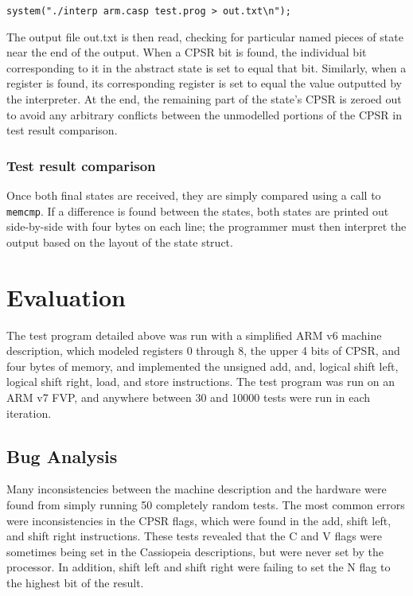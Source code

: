 \documentclass[letterpaper,12pt]{article}
\begin{document}
\texttt{system("./interp arm.casp test.prog > out.txt\textbackslash n");}

The output file out.txt is then read, checking for particular named pieces of state near the end of the output. When a CPSR bit is found, the individual bit corresponding to it in the abstract state is set to equal that bit. Similarly, when a register is found, its corresponding register is set to equal the value outputted by the interpreter. At the end, the remaining part of the state's CPSR is zeroed out to avoid any arbitrary conflicts between the unmodelled portions of the CPSR in test result comparison.

\subsubsection{Test result comparison}

Once both final states are received, they are simply compared using a call to \texttt{memcmp}. If a difference is found between the states, both states are printed out side-by-side with four bytes on each line; the programmer must then interpret the output based on the layout of the state struct.

\section{Evaluation}

The test program detailed above was run with a simplified ARM v6 machine description, which modeled registers 0 through 8, the upper 4 bits of CPSR, and four bytes of memory, and implemented the unsigned add, and, logical shift left, logical shift right, load, and store instructions. The test program was run on an ARM v7 FVP, and anywhere between 30 and 10000 tests were run in each iteration.

\subsection{Bug Analysis}

Many inconsistencies between the machine description and the hardware were found from simply running 50 completely random tests. The most common errors were inconsistencies in the CPSR flags, which were found in the add, shift left, and shift right instructions. These tests revealed that the C and V flags were sometimes being set in the Cassiopeia descriptions, but were never set by the processor. In addition, shift left and shift right were failing to set the N flag to the highest bit of the result.
\end{document}
